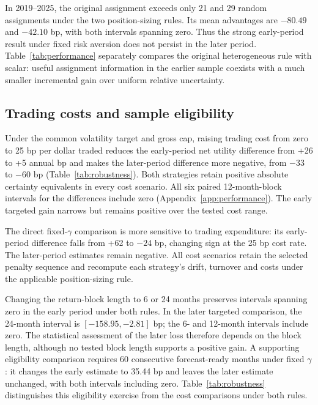 In 2019--2025, the original assignment exceeds only 21 and 29 random assignments under the two position-sizing rules. Its mean advantages are $-80.49$ and $-42.10$ bp, with both intervals spanning zero. Thus the strong early-period result under fixed risk aversion does not persist in the later period. Table~\ref{tab:performance} separately compares the original heterogeneous rule with scalar: useful assignment information in the earlier sample coexists with a much smaller incremental gain over uniform relative uncertainty.


\FloatBarrier
\subsection{Trading costs and sample eligibility}
Under the common volatility target and gross cap, raising trading cost from zero to 25 bp per dollar traded reduces the early-period net utility difference from +26 to +5 annual bp and makes the later-period difference more negative, from $-33$ to $-60$ bp (Table~\ref{tab:robustness}). Both strategies retain positive absolute certainty equivalents in every cost scenario. All six paired 12-month-block intervals for the differences include zero (Appendix~\ref{app:performance}). The early targeted gain narrows but remains positive over the tested cost range.

The direct fixed-$\gamma$ comparison is more sensitive to trading expenditure: its early-period difference falls from +62 to $-24$ bp, changing sign at the 25 bp cost rate. The later-period estimates remain negative. All cost scenarios retain the selected penalty sequence and recompute each strategy's drift, turnover and costs under the applicable position-sizing rule.

Changing the return-block length to 6 or 24 months preserves intervals spanning zero in the early period under both rules. In the later targeted comparison, the 24-month interval is $[-158.95,-2.81]$ bp; the 6- and 12-month intervals include zero. The statistical assessment of the later loss therefore depends on the block length, although no tested block length supports a positive gain. A supporting eligibility comparison requires 60 consecutive forecast-ready months under fixed $\gamma$: it changes the early estimate to 35.44 bp and leaves the later estimate unchanged, with both intervals including zero. Table~\ref{tab:robustness} distinguishes this eligibility exercise from the cost comparisons under both rules.

\FloatBarrier
